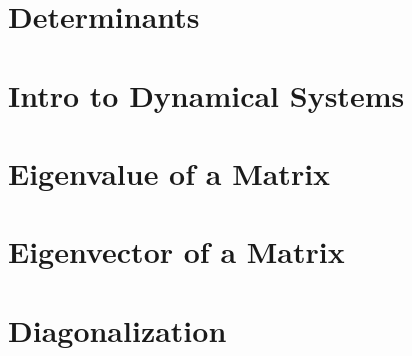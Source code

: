 \documentclass[11pt]{article}
\begin{document}
\section{Determinants}


\section{Intro to Dynamical Systems}


\section{Eigenvalue of a Matrix}


\section{Eigenvector of a Matrix}


\section{Diagonalization}


\end{document}
